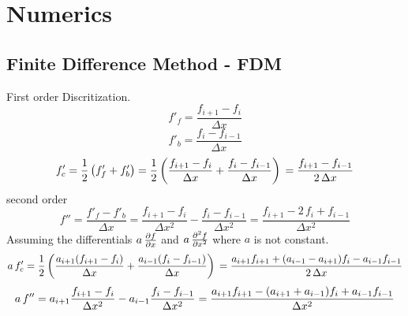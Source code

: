 \chapter{Numerics}
\section{Finite Difference Method - FDM}
First order Discritization.
\begin{equation}
    f'_f = \frac{f_{i+1} - f_i}{\Delta x}
\end{equation}
\begin{equation}
    f'_b = \frac{f_{i} - f_{i - 1}}{\Delta x}
\end{equation}
\begin{equation}
    f'_c = \frac{1}{2} \left( f'_f + f'_b \right) = \frac{1}{2} \left( \frac{f_{i+1} - f_i}{\Delta x} + \frac{f_{i} - f_{i - 1}}{\Delta x} \right) \\
    = \frac{f_{i + 1} - f_{i - 1}}{2 \, \Delta x}
\end{equation}
second order
\begin{equation}
    f'' = \frac{f'_f - f'_b}{\Delta x} = \frac{f_{i+1} - f_{i}}{\Delta x^2} - \frac{f_{i} - f_{i - 1}}{\Delta x^2} = \frac{f_{i + 1} - 2 \, f_{i} + f_{i-1}}{\Delta x^2}
\end{equation}
Assuming the differentials $a \, \pdv{f}{x}$ and $a \,\pdv[2]{f}{x}$ where $a$ is not constant.
\begin{equation}
  \label{eqn:fdm_1}
    a\,f'_c\\
    = \frac{1}{2} \left( \frac{a_{i+1}(f_{i+1} - f_i)}{\Delta x} + \frac{a_{i-1}(f_{i} - f_{i - 1})}{\Delta x} \right) \\
    = \frac{a_{i+1}f_{i + 1} + (a_{i-1} - a_{i+1})f_{i} - a_{i-1}f_{i - 1}}{2 \, \Delta x}
\end{equation}
\begin{equation}
  \label{eqn:fdm_2}
    a\,f'' \\
    = a_{i+1}\frac{f_{i+1} - f_{i}}{\Delta x^2} - a_{i-1}\frac{f_{i} - f_{i - 1}}{\Delta x^2} \\
    = \frac{a_{i+1}f_{i + 1} - (a_{i+1} + a_{i-1}) f_{i} + a_{i-1}f_{i-1}}{\Delta x^2}
\end{equation}

